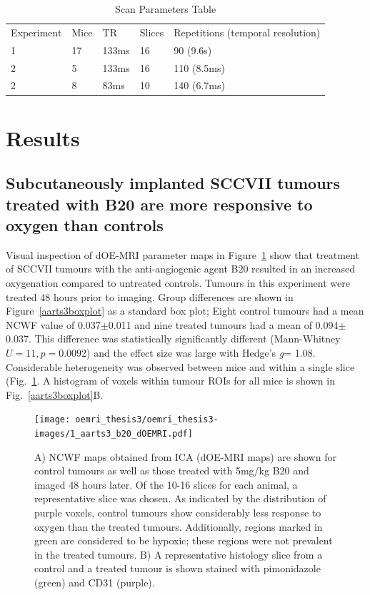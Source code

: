 \begin{table}[]
\centering
\begin{tabular}{lllll}
Experiment & Mice & TR & Slices & Repetitions (temporal resolution) \\
 1 & 17 & 133ms & 16 & 90 (9.6s)  \\
 2 & 5 & 133ms & 16 &  110 (8.5ms)  \\
 2 & 8 & 83ms & 10 & 140 (6.7ms) \\
\end{tabular}
\caption{Scan Parameters Table}
\label{scanparams}
\end{table}

\section{Results} 

\subsection{Subcutaneously implanted SCCVII tumours treated with B20 are more responsive to oxygen than controls}

Visual inspection of \ac{dOE-MRI} parameter maps in Figure~\ref{dOEMRImaps} show that treatment of SCCVII tumours with the anti-angiogenic agent B20 resulted in an increased oxygenation compared to untreated controls.
Tumours in this experiment were treated 48 hours prior to imaging.
Group differences are shown in Figure~\ref{aarts3boxplot} as a standard box plot; Eight control tumours had a mean \acs{NCWF} value of 0.037$\pm$0.011 and nine treated tumours had a mean of 0.094$\pm$0.037.
This difference was statistically significantly different (Mann-Whitney$U = 11 , p = 0.0092$) and the effect size was large with Hedge's \emph{g}= 1.08.
Considerable heterogeneity was observed between mice and within a single slice (Fig.~\ref{dOEMRImaps}.
A histogram of voxels within tumour \acs{ROI}s for all mice is shown in Fig.~\ref{aarts3boxplot}B.

\begin{figure}[htbp]
   \centering
   \texttt{[image: oemri\_thesis3/oemri\_thesis3-images/1\_aarts3\_b20\_dOEMRI.pdf]} %
   \caption{A) \acs{NCWF} maps obtained from \ac{ICA} (\ac{dOE-MRI} maps) are shown for control tumours as well as those treated with 5mg/kg B20 and imaged 48 hours later.
   Of the 10-16 slices for each animal, a representative slice was chosen.
   As indicated by the distribution of purple voxels, control tumours show considerably less response to oxygen than the treated tumours.
   Additionally, regions marked in green are considered to be hypoxic; these regions were not prevalent in the treated tumours.
   B) A representative histology slice from a control and a treated tumour is shown stained with pimonidazole (green) and CD31 (purple).}
   \label{dOEMRImaps}
\end{figure}

